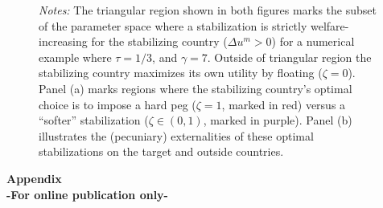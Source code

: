 \documentclass[12pt,letter]{article}
\theoremstyle{break} \theorembodyfont{\normalfont\itshape}
\theoremstyle{break}
\theoremstyle{break} \theorembodyfont{\normalfont\itshape}
\theoremstyle{break} \theorembodyfont{\normalfont\itshape}
\begin{document}
\begin{figure}
\begin{minipage}{\linewidth}
\begin{centering}
\begin{subfigure}{.49\textwidth}
      \end{subfigure}

    \end{centering}

    \bigskip \small \textit{Notes:} The triangular region shown in
    both figures marks the subset of the parameter space where a
    stabilization is strictly welfare-increasing for the stabilizing
    country ($\Delta u^m>0 $) for a numerical example where
    \(\tau=1/3\), and \(\gamma=7\). Outside of triangular region the
    stabilizing country maximizes its own utility by floating
    ($\zeta=0 $). Panel (a) marks regions where the stabilizing
    country's optimal choice is to impose a hard peg ($\zeta=1 $,
    marked in red) versus a ``softer'' stabilization
    ($\zeta\in (0,1) $, marked in purple). Panel (b) illustrates the
    (pecuniary) externalities of these optimal stabilizations on the
    target and outside countries. \end{minipage}
\end{figure}

\clearpage



\bigskip \pagebreak \appendix

\FloatBarrier

\begin{center}
  {\Huge\bf Appendix}\\
  {\large\bf -For online publication only-}
\end{center}


\end{document}
